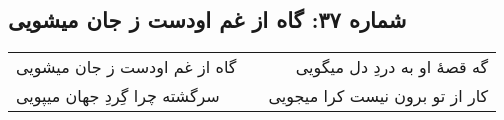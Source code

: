 \begin{center}
\section*{شماره ۳۷: گاه از غم اودست ز جان میشویی}
\label{sec:037}
\begin{longtable}{l p{0.5cm} r}
گاه از غم اودست ز جان میشویی
&&
گه قصهٔ او به دردِ دل میگویی
\\
سرگشته چرا گِردِ جهان میپویی
&&
کار از تو برون نیست کرا میجویی
\\
\end{longtable}
\end{center}
